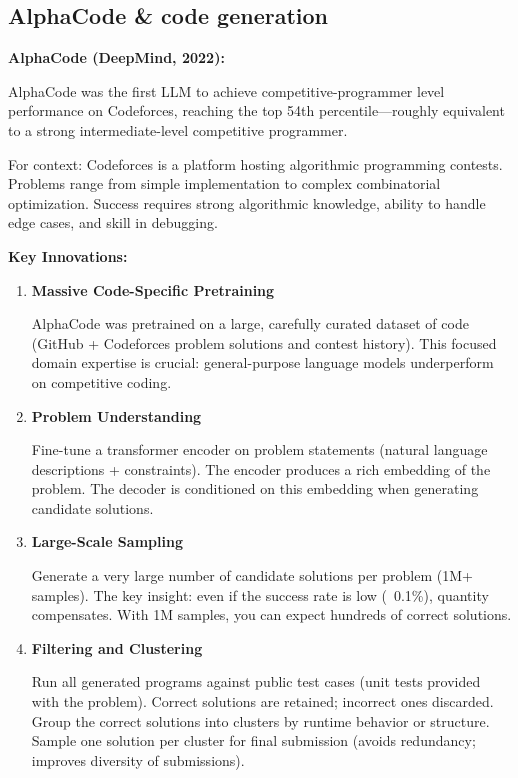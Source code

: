 \subsection{AlphaCode \& code generation}

\textbf{AlphaCode (DeepMind, 2022):}

AlphaCode was the first LLM to achieve competitive-programmer level performance on Codeforces, reaching the top 54th percentile—roughly equivalent to a strong intermediate-level competitive programmer.

\begin{notebox}
For context: Codeforces is a platform hosting algorithmic programming contests. Problems range from simple implementation to complex combinatorial optimization. Success requires strong algorithmic knowledge, ability to handle edge cases, and skill in debugging.
\end{notebox}

\textbf{Key Innovations:}

\begin{enumerate}
    \item \textbf{Massive Code-Specific Pretraining}

    AlphaCode was pretrained on a large, carefully curated dataset of code (GitHub + Codeforces problem solutions and contest history). This focused domain expertise is crucial: general-purpose language models underperform on competitive coding.

    \item \textbf{Problem Understanding}

    Fine-tune a transformer encoder on problem statements (natural language descriptions + constraints). The encoder produces a rich embedding of the problem. The decoder is conditioned on this embedding when generating candidate solutions.

    \item \textbf{Large-Scale Sampling}

    Generate a very large number of candidate solutions per problem (1M+ samples). The key insight: even if the success rate is low (~0.1\%), quantity compensates. With 1M samples, you can expect hundreds of correct solutions.

    \item \textbf{Filtering and Clustering}

    Run all generated programs against public test cases (unit tests provided with the problem). Correct solutions are retained; incorrect ones discarded. Group the correct solutions into clusters by runtime behavior or structure. Sample one solution per cluster for final submission (avoids redundancy; improves diversity of submissions).
\end{enumerate}

